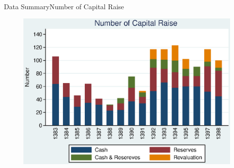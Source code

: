 \documentclass{beamer}
\begin{document}
\begin{frame}{Data Summary}{Number of Capital Raise}
\begin{figure}
\centering
\includegraphics[width=0.7\linewidth]{Number2.eps}
\label{fig:number2}
\end{figure}

\end{frame}


%
%
%
%
%
%
%
%
%
%
%
\end{document}
